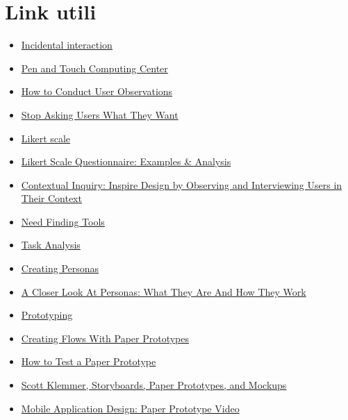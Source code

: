 \chapter*{Link utili}

\begin{itemize}
    \item \href{https://www.alandix.com/academic/topics/incidental/}{Incidental interaction}
    \item \href{http://www.cs.brown.edu/research/ptc/index.html}{Pen and Touch Computing Center}
    \item \href{https://www.interaction-design.org/literature/article/how-to-conduct-user-observations}{How to Conduct User Observations}
    \item \href{https://uxplanet.org/stop-asking-users-what-they-want-21e9ba646bce}{Stop Asking Users What They Want}
    \item \href{https://en.wikipedia.org/wiki/Likert_scale}{Likert scale}
    \item \href{https://www.simplypsychology.org/likert-scale.html}{Likert Scale Questionnaire: Examples \& Analysis}
    \item \href{https://www.nngroup.com/articles/contextual-inquiry/}{Contextual Inquiry: Inspire Design by Observing and Interviewing Users in Their Context}
    \item \href{http://hci.stanford.edu/courses/cs447/docs/NeedFindingCribSheet.pdf}{Need Finding Tools}
    \item \href{http://www.usabilitybok.org/task-analysis}{Task Analysis}
    \item \href{https://uxbooth.com/articles/creating-personas/}{Creating Personas}
    \item \href{https://www.smashingmagazine.com/2014/08/a-closer-look-at-personas-part-1/}{A Closer Look At Personas: What They Are And How They Work}
    \item \href{http://web.mit.edu/6.813/www/sp18/classes/11-prototyping/}{Prototyping}
    \item \href{https://youtu.be/GrV2SZuRPv0}{Creating Flows With Paper Prototypes}
    \item \href{https://youtu.be/OlbdIXLunt4?t=596}{How to Test a Paper Prototype}
    \item \href{https://youtu.be/z4glsttyxw8}{Scott Klemmer, Storyboards, Paper Prototypes, and Mockups}
    \item \href{https://www.youtube.com/watch?v=y20E3qBmHpg}{Mobile Application Design: Paper Prototype Video}

\end{itemize}
